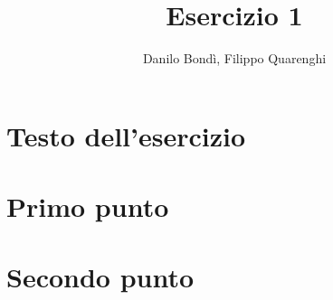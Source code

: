 \documentclass[11pt, titlepage]{article}
\title{\textbf{Esercizio 1}}
\author{Danilo Bondì, Filippo Quarenghi}
\date{}
\begin{document}
\maketitle
%

\section*{Testo dell'esercizio}


\section*{Primo punto}


\section*{Secondo punto}

\end{document}
